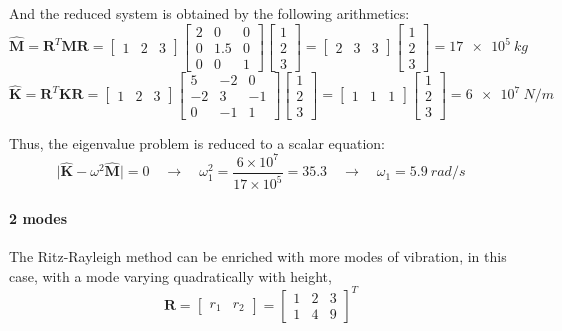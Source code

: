 \begin{Answer}[ref={three_storey_helicopter}]
And the reduced system is obtained by the following arithmetics:
$$
\hat{\mathbf{M}} = \mathbf{R}^T \mathbf{M} \mathbf{R} =
\begin{bmatrix}
    1 & 2 & 3
\end{bmatrix}
\begin{bmatrix}
    2 & 0 & 0 \\
    0 & 1.5 & 0 \\
    0 & 0 & 1
\end{bmatrix}
\begin{bmatrix}
    1 \\ 2 \\ 3
\end{bmatrix} =
\begin{bmatrix}
    2 & 3 & 3
\end{bmatrix}
\begin{bmatrix}
    1 \\ 2 \\ 3
\end{bmatrix} = \SI{17e5}{kg}
$$
$$
\hat{\mathbf{K}} = \mathbf{R}^T \mathbf{K} \mathbf{R} =
\begin{bmatrix}
    1 & 2 & 3
\end{bmatrix}\!
\begin{bmatrix}
    5 & -2 & 0 \\
    -2 & 3 & -1 \\
    0 & -1 & 1
\end{bmatrix}\!
\begin{bmatrix}
    1 \\ 2 \\ 3
\end{bmatrix} =
\begin{bmatrix}
    1 & 1 & 1
\end{bmatrix}\!
\begin{bmatrix}
    1 \\ 2 \\ 3
\end{bmatrix} = \SI{6e7}{N/m}
$$

Thus, the eigenvalue problem is reduced to a scalar equation:
$$
\vert \hat{\mathbf{K}} - \omega^2\hat{\mathbf{M}} \vert = 0 \quad \rightarrow \quad
\omega^2_1 = \frac{6\times 10^7}{17\times 10^5} = 35.3 \quad \rightarrow \quad
\omega_1 = \SI{5.9}{rad/s}
$$


\paragraph{2 modes} The Ritz-Rayleigh method can be enriched with more modes of vibration, in this case, with a mode varying quadratically with height,
$$
\mathbf{R} =
\begin{bmatrix}
    r_1 & r_2
\end{bmatrix} =
\begin{bmatrix}
    1 & 2 & 3 \\
    1 & 4 & 9
\end{bmatrix}^T
$$


\end{Answer}
